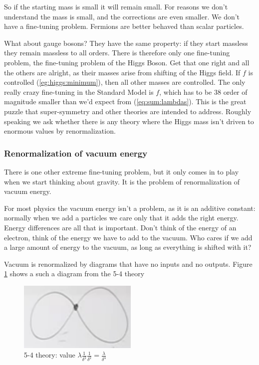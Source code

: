 \documentclass[]{article}
\begin{document}
So if the starting mass is small it will remain small. For reasons we don't understand the mass is small, and the corrections are even smaller. We don't have a fine-tuning problem. Fermions are better behaved than scalar particles.

What about gauge bosons? They have the same property: if they start massless they remain massless to all orders. There is therefore only one fine-tuning problem, the fine-tuning problem of the Higgs Boson. Get that one right and all the others are alright, as their masses arise from shifting of the Higgs field. If $f$ is controlled (\ref{eg:higgs:minimum}), then all other masses are controlled. The only really crazy fine-tuning in the Standard Model is  $f$, which has to be 38 order of magnitude smaller than we'd expect from (\ref{eq:sum:lambdas}). This is the great puzzle that super-symmetry and other theories are intended to address. Roughly speaking we ask whether there is any theory where the Higgs mass isn't driven to enormous values by renormalization.

\subsubsection{Renormalization of vacuum energy}\label{sect:vacuum:energy:renormalization}
There is one other extreme fine-tuning problem, but it only comes in to play when we start thinking about gravity. It is the problem of renormalization of vacuum energy.

For most physics the vacuum energy isn't a problem, as it is an additive constant: normally when we add a particles we care only that it adds the right energy. Energy differences are all that is important. Don't think of the energy of an electron, think of the energy we have to add to the vacuum. Who cares if we add a large amount of energy to the vacuum, as long as everything is shifted with it? 

Vacuum is renormalized by diagrams that have no inputs and no outputs. Figure \ref{fig:particles3-1-5-4-theory} shows a such a diagram from the 5-4 theory
\begin{figure}[H]
	\begin{center}
		\caption{5-4 theory: value $\lambda \frac{1}{\delta^2} \frac{1}{\delta^2}= \frac{\lambda}{\delta^4}$}\label{fig:particles3-1-5-4-theory}
		\includegraphics{particles3-1-5-4-theory}
	\end{center}
\end{figure}
\end{document}
